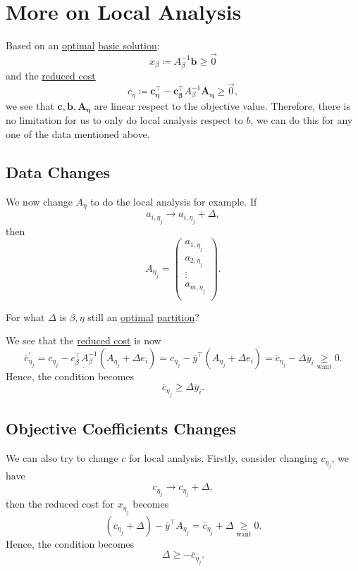 \section{More on Local Analysis}
\begin{prev}
	Based on an \hyperref[def:optimal-solution]{optimal} \hyperref[def:basic-solution]{basic solution}:
	\[
		\overline{x}_{\beta} \coloneqq A^{-1}_{\beta}\bm{b}\geq \vec{0}
	\]
	and the \hyperref[def:reduced-cost]{reduced cost}
	\[
		\overline{c}_{\eta}\coloneqq \bm{c_{\eta}^{\top}} - \bm{c^{\top}_{\beta}}A^{-1}_{\beta}\bm{A_{\eta}} \geq \vec{0},
	\]
	we see that \(\bm{c}, \bm{b}, \bm{A_{\eta}}\) are linear respect to the objective value. Therefore, there is no limitation for us to only do local analysis
	respect to \(b\), we can do this for any one of the data mentioned above.
\end{prev}

\subsection{Data Changes}
We now change \(A_{\eta}\) to do the local analysis for example. If
\[
	a_{i, \eta_j} \to a_{i, \eta_{j}}+\Delta,
\]
then
\[
	A_{\eta_j} = \begin{pmatrix}
		a_{1, \eta_{j}} \\
		a_{2, \eta_{j}} \\
		\vdots          \\
		a_{m, \eta_{j}} \\
	\end{pmatrix}.
\]
\begin{problem*}
	For what \(\Delta\) is \(\beta, \eta\) still an \hyperref[def:optimal-solution]{optimal} \hyperref[def:basic-partition]{partition}?
\end{problem*}
\begin{answer}
	We see that the \hyperref[def:reduced-cost]{reduced cost} is now
	\[
		\overline{c}_{\eta_{j}}^\prime
		= c_{\eta_{j}} - \underline{c_{\beta}^{\top}A^{-1}_{\beta}}\left( A_{\eta_{j}} +\Delta e_{i}\right)
		= c_{\eta_{j}} - \overline{y}^{\top}(A_{\eta_{j}}+\Delta e_{i})
		= \overline{c}_{\eta_{j}} - \Delta \overline{y}_i
		\underset{\text{want}}{\geq} 0.
	\]
	Hence, the condition becomes
	\[
		\overline{c}_{\eta_{j}} \geq \Delta \overline{y}_i.
	\]
\end{answer}

\subsection{Objective Coefficients Changes}
We can also try to change \(c\) for local analysis. Firstly, consider changing \(c_{\eta_{j}}\), we have
\[
	c_{\eta_{j}}\to c_{\eta_{j}}+\Delta,
\]
then the reduced cost for \(x_{\eta_{j}}\) becomes
\[
	(c_{\eta_{j}}+\Delta) - \overline{y}^{\top}A_{\eta_{j}} = \overline{c}_{\eta_{j}}+\Delta\underset{\text{want}}{\geq} 0.
\]
Hence, the condition becomes
\[
	\Delta\geq -\overline{c}_{\eta_{j}}.
\]

